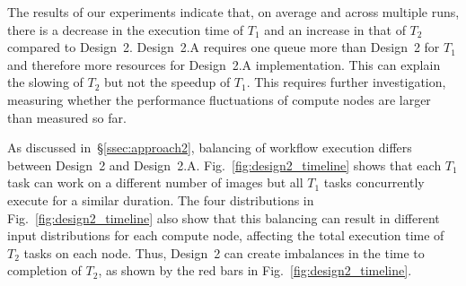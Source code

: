 The results of our experiments indicate that, on average and across multiple runs, there is a decrease in the execution time of $T_{1}$ and an increase in that of $T_{2}$ compared to Design~2.
Design~2.A requires one queue more than Design~2 for $T_{1}$ and therefore more resources for Design~2.A implementation.
This can explain the slowing of $T_{2}$ but not the speedup of $T_{1}$.
This requires further investigation, measuring whether the performance fluctuations of compute nodes are larger than measured so far.


As discussed in~\S\ref{ssec:approach2}, balancing of workflow execution differs between Design~2 and Design~2.A. Fig.~\ref{fig:design2_timeline} shows that each $T_{1}$ task can work on a different number of images but all $T_{1}$ tasks concurrently execute for a similar duration.
The four distributions in Fig.~\ref{fig:design2_timeline} also show that this balancing can result in different input distributions for each compute node, affecting the total execution time of $T_{2}$ tasks on each node.
Thus, Design~2 can create imbalances in the time to completion of $T_{2}$, as shown by the red bars in Fig.~\ref{fig:design2_timeline}.

